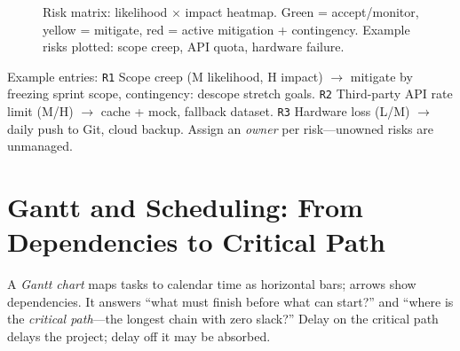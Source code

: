 \begin{figure}[h]
\caption{Risk matrix: likelihood $\times$ impact heatmap. Green = accept/monitor, yellow = mitigate, red = active mitigation + contingency. Example risks plotted: scope creep, API quota, hardware failure.}
\label{fig:risk-matrix}
\end{figure}

Example entries: \texttt{R1} Scope creep (M likelihood, H impact) $\to$ mitigate by freezing sprint scope, contingency: descope stretch goals. \texttt{R2} Third-party API rate limit (M/H) $\to$ cache + mock, fallback dataset. \texttt{R3} Hardware loss (L/M) $\to$ daily push to Git, cloud backup. Assign an \emph{owner} per risk---unowned risks are unmanaged.

\section{Gantt and Scheduling: From Dependencies to Critical Path}
\label{sec:gantt}
A \emph{Gantt chart} maps tasks to calendar time as horizontal bars; arrows show dependencies. It answers ``what must finish before what can start?'' and ``where is the \emph{critical path}---the longest chain with zero slack?'' Delay on the critical path delays the project; delay off it may be absorbed.

